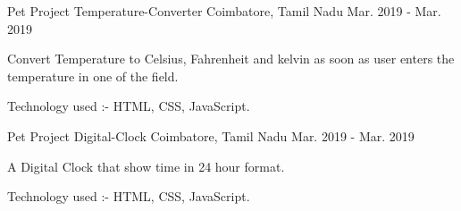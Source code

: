 \begin{cventries}
\cventry
    {Pet Project} %
    {{Temperature-Converter}} %
    {Coimbatore, Tamil Nadu} %
    {Mar. 2019 - Mar. 2019} %
    {
      \begin{cvitems} %
        \item {Convert Temperature to Celsius, Fahrenheit and kelvin as soon as user enters the temperature in one of the field.}
        \item {Technology used :- HTML, CSS, JavaScript.}
      \end{cvitems}
    }
    
    \cventry
    {Pet Project} %
    {{Digital-Clock}} %
    {Coimbatore, Tamil Nadu} %
    {Mar. 2019 - Mar. 2019} %
    {
      \begin{cvitems} %
        \item {A Digital Clock that show time in 24 hour format.}
        \item {Technology used :- HTML, CSS, JavaScript.}
      \end{cvitems}
    }
    
    
    

    
    
\end{cventries}






